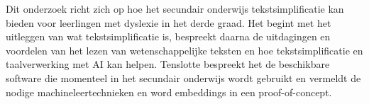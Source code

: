 
Dit onderzoek richt zich op hoe het secundair onderwijs tekstsimplificatie kan bieden voor leerlingen met dyslexie in het derde graad. Het begint met het uitleggen van wat tekstsimplificatie is, bespreekt daarna de uitdagingen en voordelen van het lezen van wetenschappelijke teksten en hoe tekstsimplificatie en taalverwerking met AI kan helpen. Tenslotte bespreekt het de beschikbare software die momenteel in het secundair onderwijs wordt gebruikt en vermeldt de nodige machineleertechnieken en word embeddings in een proof-of-concept.




